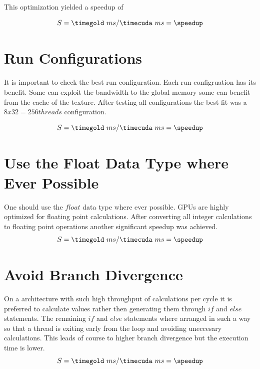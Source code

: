 This optimization yielded  a speedup of 

\fpDiv{\speedup}{\timegold}{\timecuda}
\begin{equation*}\label{eq:speedup0}
	S = \timegold\ ms/\timecuda\ ms = \speedup
\end{equation*}


\section{Run Configurations} %
\label{sec:run_configurations}

It is important to check the best run configuration. Each run configruation 
has its benefit. Some can exploit the bandwidth to the global memory some can
benefit from the cache of the texture. After testing all configurations the 
best fit was a $8x32=256 threads$ configuration.

\fpDiv{\speedup}{\timegold}{\timecuda}
\begin{equation*}\label{eq:speedup0}
	S = \timegold\ ms/\timecuda\ ms = \speedup
\end{equation*}



\section{Use the Float Data Type where Ever Possible}
One should use the $float$ data type where ever possible. \glspl{GPU} are 
highly optimized for floating point calculations. After converting all integer
calculations to floating point operations another significant speedup was 
achieved.
\fpDiv{\speedup}{\timegold}{\timecuda}
\begin{equation*}\label{eq:speedup0}
	S = \timegold\ ms/\timecuda\ ms = \speedup
\end{equation*}


\section{Avoid Branch Divergence} %
\label{sec:avoid_branch_divergence}
On a architecture with such high throughput of calculations per cycle it is preferred
to calculate values rather then generating them through $if$ and $else$ statements.
The remaining $if$ and $else$ statements where arranged in such a way so that a 
thread is exiting early from the loop and avoiding uneccesary calculations. This leads
of course to higher branch divergence but the execution time is lower. 
\fpDiv{\speedup}{\timegold}{\timecuda}
\begin{equation*}\label{eq:speedup0}
	S = \timegold\ ms/\timecuda\ ms = \speedup
\end{equation*}

